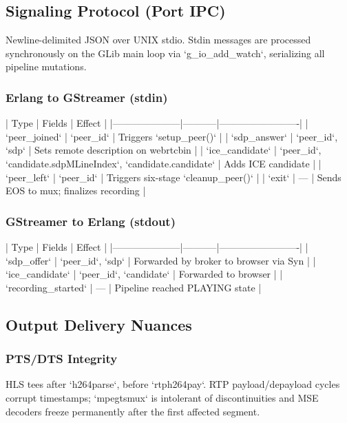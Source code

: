 \documentclass{article}
\let\originalfootnotesize\footnotesize
\let\oldverbatim\verbatim
\let\oldendverbatim\endverbatim
\renewenvironment{verbatim}{\originalfootnotesize\oldverbatim}{\oldendverbatim}
\begin{document}
\subsection{Signaling Protocol (Port IPC)}

Newline-delimited JSON over UNIX stdio. Stdin messages are processed synchronously
on the GLib main loop via `g\_io\_add\_watch`, serializing all pipeline mutations.

\subsubsection{Erlang to GStreamer (stdin)}

\begin{verbatim}
| Type                | Fields    | Effect                  |
|---------------------|-----------|-------------------------|
| `peer_joined`       | `peer_id` | Triggers `setup_peer()` |
| `sdp_answer`        | `peer_id`, `sdp` | Sets remote description on webrtcbin |
| `ice_candidate`     | `peer_id`, `candidate.sdpMLineIndex`, `candidate.candidate` | Adds ICE candidate |
| `peer_left`         | `peer_id` | Triggers six-stage `cleanup_peer()` |
| `exit`              | — | Sends EOS to mux; finalizes recording |
\end{verbatim}

\subsubsection{GStreamer to Erlang (stdout)}

\begin{verbatim}
| Type                | Fields    | Effect                  |
|---------------------|-----------|-------------------------|
| `sdp_offer`         | `peer_id`, `sdp` | Forwarded by broker to browser via Syn |
| `ice_candidate`     | `peer_id`, `candidate` | Forwarded to browser |
| `recording_started` | — | Pipeline reached PLAYING state |
\end{verbatim}

\subsection{Output Delivery Nuances}

\subsubsection{PTS/DTS Integrity}

HLS tees after `h264parse`, before `rtph264pay`. RTP payload/depayload cycles
corrupt timestamps; `mpegtsmux` is intolerant of discontinuities and MSE decoders
freeze permanently after the first affected segment.
\end{document}
